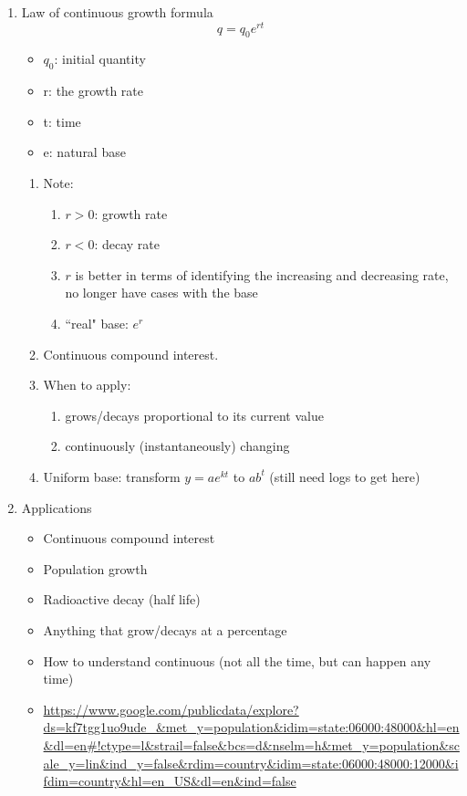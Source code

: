 \documentclass{article}
\begin{document}
\begin{enumerate}
\item Law of continuous growth formula
$$
q = q_0e^{rt}
$$
\begin{itemize}
\item $q_0$: initial quantity
\item r: the growth rate
\item t: time
\item e: natural base
\end{itemize}
\begin{enumerate}
\item Note:
\begin{enumerate}
\item $r>0$: growth rate
\item $r<0$: decay rate
\item $r$ is better in terms of identifying the increasing and decreasing rate, no longer have cases with the base
\item ``real" base: $e^r$
\end{enumerate}
\item Continuous compound interest.
\item When to apply: 
\begin{enumerate}
\item grows/decays proportional to its current value
\item continuously (instantaneously) changing 
\end{enumerate}
\item Uniform base: transform $y = ae^{kt}$ to $ab^t$ (still need logs to get here)
\end{enumerate}

\item Applications
\begin{itemize}
\item Continuous compound interest
\item Population growth
\item Radioactive decay (half life)
\item Anything that grow/decays at a percentage
\item How to understand continuous (not all the time, but can happen any time)
\item \url{https://www.google.com/publicdata/explore?ds=kf7tgg1uo9ude_&met_y=population&idim=state:06000:48000&hl=en&dl=en#!ctype=l&strail=false&bcs=d&nselm=h&met_y=population&scale_y=lin&ind_y=false&rdim=country&idim=state:06000:48000:12000&ifdim=country&hl=en_US&dl=en&ind=false}
\end{itemize}
\end{enumerate}
\end{document}
